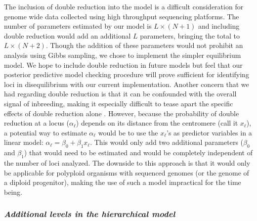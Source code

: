 \documentclass[11pt,english,letterpaper,oneside]{article}
\begin{document}
The inclusion of double reduction into the model is a difficult consideration for genome wide data collected using high throughput sequencing platforms. The number of parameters estimated by our model is $L\times(N+1)$ and including double reduction would add an additional $L$ parameters, bringing the total to $L\times(N+2)$. Though the addition of these parameters would not prohibit an analysis using Gibbs sampling, we chose to implement the simpler equilibrium model. We hope to include double reduction in future models but feel that our posterior predictive model checking procedure will prove sufficient for identifying loci in disequilibrium with our current implementation. Another concern that we had regarding double reduction is that it can be confounded with the overall signal of inbreeding, making it especially difficult to tease apart the specific effects of double reduction alone \citep{hardy2015autopolyploids}. However, because the probability of double reduction at a locus ($\alpha_\ell$) depends on its distance from the centromere (call it $x_\ell$), a potential way to estimate $\alpha_\ell$ would be to use the $x_\ell$'s as predictor variables in a linear model: $\alpha_{\ell} = \beta_0 + \beta_1 x_{\ell}$. This would only add two additional parameters ($\beta_0$ and $\beta_1$) that would need to be estimated and would be completely independent of the number of loci analyzed. The downside to this approach is that it would only be applicable for polyploid organisms with sequenced genomes (or the genome of a diploid progenitor), making the use of such a model impractical for the time being.
\medskip

\subsubsection{{\itshape Additional levels in the hierarchical model}}
\medskip
\end{document}

